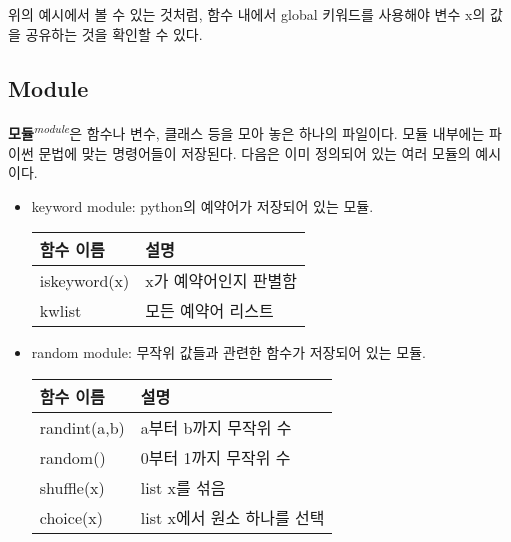 위의 예시에서 볼 수 있는 것처럼, 함수 내에서 global 키워드를 사용해야 변수 x의 값을 공유하는 것을 확인할 수 있다.

\subsection{Module}

\textbf{모듈}\textit{\textsuperscript{module}}은 함수나 변수, 클래스 등을 모아 놓은 하나의 파일이다. 모듈 내부에는 파이썬 문법에 맞는 명령어들이 저장된다. 다음은 이미 정의되어 있는 여러 모듈의 예시이다.

\begin{itemize}
    \item keyword module: python의 예약어가 저장되어 있는 모듈.
    \begin{longtable}[]{@{}p{4cm} p{10cm}@{}}
    \toprule
        함수 이름 & 설명 \\
        \midrule
        \endhead
        iskeyword(x) & x가 예약어인지 판별함 \\
        kwlist & 모든 예약어 리스트 \\
    \bottomrule
    \end{longtable}

    \item random module: 무작위 값들과 관련한 함수가 저장되어 있는 모듈.
    \begin{longtable}[]{@{}p{4cm} p{10cm}@{}}
    \toprule
        함수 이름 & 설명 \\
        \midrule
        \endhead
        randint(a,b) & a부터 b까지 무작위 수 \\
        random() & 0부터 1까지 무작위 수 \\
        shuffle(x) & list x를 섞음 \\
        choice(x) & list x에서 원소 하나를 선택 \\
    \bottomrule
    \end{longtable}
\end{itemize}
